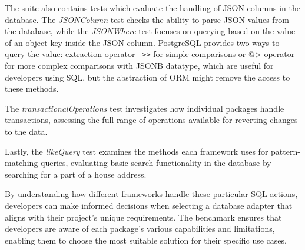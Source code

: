 The suite also contains tests which evaluate the handling of JSON columns in the
database. The \textit{JSONColumn} test checks the ability to parse JSON values
from the database, while the \textit{JSONWhere} test focuses on querying based
on the value of an object key inside the JSON column. PostgreSQL provides two
ways to query the value: extraction operator \texttt{->>} for simple comparisons
or @> operator for more complex comparisons with JSONB datatype, which are
useful for developers using SQL, but the abstraction of ORM might remove the
access to these methods.

The \textit{transactionalOperations} test investigates how individual packages
handle transactions, assessing the full range of operations available for
reverting changes to the data.

Lastly, the \textit{likeQuery} test examines the methods each framework uses for
pattern-matching queries, evaluating basic search functionality in the database
by searching for a part of a house address.

By understanding how different frameworks handle these particular SQL actions,
developers can make informed decisions when selecting a database adapter that
aligns with their project's unique requirements. The benchmark ensures that
developers are aware of each package's various capabilities and limitations,
enabling them to choose the most suitable solution for their specific use cases.